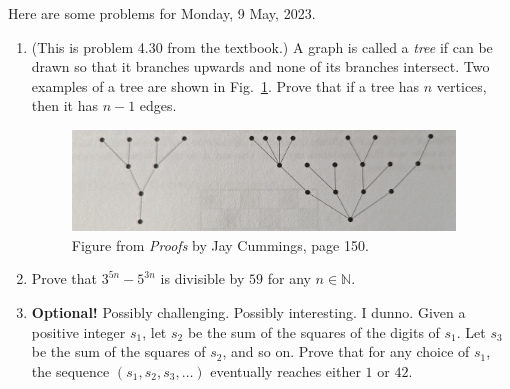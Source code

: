 \documentclass[12pt]{article} %
\begin{document}
Here are some problems for Monday, 9 May, 2023.
\bigskip

\begin{enumerate}
\setlength{\itemsep}{20mm} %

\item (This is problem 4.30 from the textbook.) A graph is called a
  \emph{tree} if can be drawn so that it branches upwards and none of
  its branches intersect. Two examples of a tree are shown in
  Fig.~\ref{fig:tree}. Prove that if a tree has $n$ vertices, then it
  has $n-1$ edges.

\begin{figure}[h]
  \centering
\vspace{2mm}
  \includegraphics[width=4in]{tree.jpg}
\caption{Figure from \emph{Proofs} by Jay Cummings, page 150.}
\label{fig:tree}
\end{figure}



\item Prove that $3^{5n} - 5^{3n}$ is divisible by $59$ for any $n \in
  \mathbb{N}$. 


  
\item {\bf Optional!} Possibly challenging. Possibly interesting. I
  dunno.  Given a positive integer $s_1$, let $s_2$ be the sum of the
  squares of the digits of $s_1$. Let $s_3$ be the sum of the squares
  of $s_2$, and so on. Prove that for any choice of $s_1$, the
  sequence $(s_1, s_2, s_3, \ldots )$ eventually reaches either $1$ or
  $42$. 

  
\end{enumerate}
\end{document}
